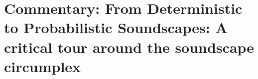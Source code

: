 \documentclass[twoside,fontsize=12pt,titlepage]{scrbook}
\begin{document}
 

\section[Commentary]{Commentary: From Deterministic to Probabilistic Soundscapes: A critical tour around the soundscape circumplex}

 





 



 \backmatter

 

\end{document}
